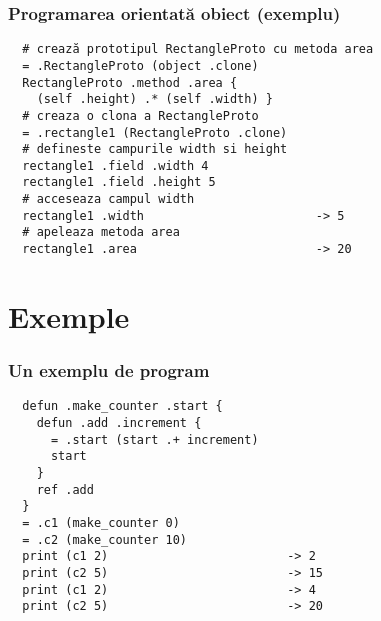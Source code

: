 \documentclass{beamer}
\begin{document}
\begin{frame}[containsverbatim]
  \frametitle{Programarea orientată obiect (exemplu)}
  \color{blue}
  \begin{verbatim}
  # crează prototipul RectangleProto cu metoda area
  = .RectangleProto (object .clone)
  RectangleProto .method .area { 
    (self .height) .* (self .width) }
  # creaza o clona a RectangleProto
  = .rectangle1 (RectangleProto .clone)
  # defineste campurile width si height
  rectangle1 .field .width 4
  rectangle1 .field .height 5
  # acceseaza campul width
  rectangle1 .width                        -> 5
  # apeleaza metoda area
  rectangle1 .area                         -> 20\end{verbatim}
  \color{black}

\end{frame}

\section{Exemple}
\begin{frame}[containsverbatim]
  \frametitle{Un exemplu de program}
  \color{blue}
  \begin{verbatim}
  defun .make_counter .start {
    defun .add .increment {
      = .start (start .+ increment)
      start
    }
    ref .add
  }
  = .c1 (make_counter 0)
  = .c2 (make_counter 10)
  print (c1 2)                         -> 2
  print (c2 5)                         -> 15
  print (c1 2)                         -> 4
  print (c2 5)                         -> 20
  \end{verbatim}
  \color{black}
\end{frame}
\end{document}
